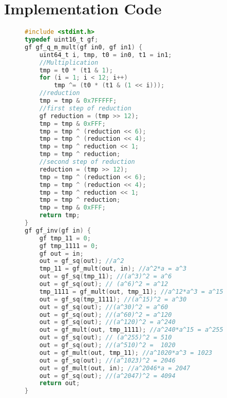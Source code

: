 \documentclass[brazil, english]{ufsc-thesis}
\begin{document}
\postextual


\appendix
\chapter{Implementation Code}
\begin{figure}
\begin{lstlisting}[caption={Multiplication of two elements in $\mathbb{F}_{2^{12}}$ and inversion of an element in $\mathbb{F}_{2^{12}}$},label={lst:label},language=C]
#include <stdint.h>
typedef uint16_t gf;
gf gf_q_m_mult(gf in0, gf in1) {
    uint64_t i, tmp, t0 = in0, t1 = in1;
    //Multiplication
    tmp = t0 * (t1 & 1);
    for (i = 1; i < 12; i++)
        tmp ^= (t0 * (t1 & (1 << i)));
    //reduction
    tmp = tmp & 0x7FFFFF;
    //first step of reduction
    gf reduction = (tmp >> 12);
    tmp = tmp & 0xFFF;
    tmp = tmp ^ (reduction << 6);
    tmp = tmp ^ (reduction << 4);
    tmp = tmp ^ reduction << 1;
    tmp = tmp ^ reduction;
    //second step of reduction
    reduction = (tmp >> 12);
    tmp = tmp ^ (reduction << 6);
    tmp = tmp ^ (reduction << 4);
    tmp = tmp ^ reduction << 1;
    tmp = tmp ^ reduction;
    tmp = tmp & 0xFFF;
    return tmp;
}
gf gf_inv(gf in) {
    gf tmp_11 = 0;
    gf tmp_1111 = 0;
    gf out = in;
    out = gf_sq(out); //a^2
    tmp_11 = gf_mult(out, in); //a^2*a = a^3
    out = gf_sq(tmp_11); //(a^3)^2 = a^6
    out = gf_sq(out); // (a^6)^2 = a^12
    tmp_1111 = gf_mult(out, tmp_11); //a^12*a^3 = a^15
    out = gf_sq(tmp_1111); //(a^15)^2 = a^30
    out = gf_sq(out); //(a^30)^2 = a^60
    out = gf_sq(out); //(a^60)^2 = a^120
    out = gf_sq(out); //(a^120)^2 = a^240
    out = gf_mult(out, tmp_1111); //a^240*a^15 = a^255
    out = gf_sq(out); // (a^255)^2 = 510
    out = gf_sq(out); //(a^510)^2 =  1020
    out = gf_mult(out, tmp_11); //a^1020*a^3 = 1023
    out = gf_sq(out); //(a^1023)^2 = 2046
    out = gf_mult(out, in); //a^2046*a = 2047
    out = gf_sq(out); //(a^2047)^2 = 4094
    return out;
}
\end{lstlisting}
\end{figure}
\end{document}
